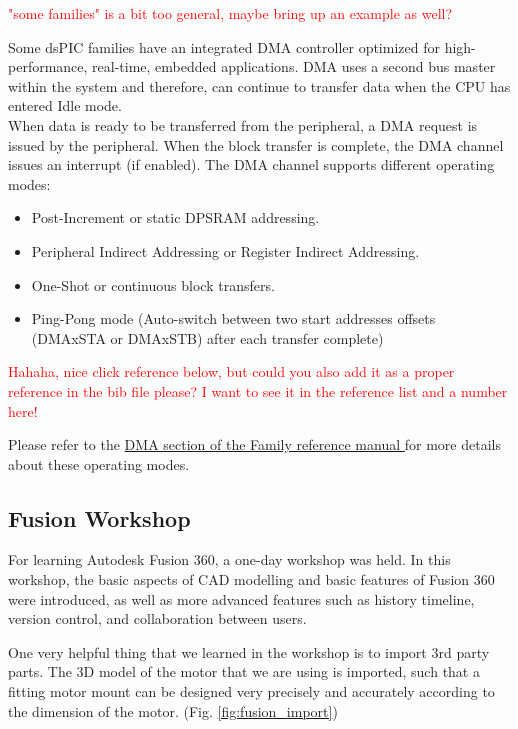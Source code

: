 \textcolor{red}{"some families" is a bit too general, maybe bring up an example as well?}

\vskip 0.2in
\noindent
Some dsPIC families have an integrated DMA controller optimized for high-performance, real-time, embedded applications. DMA uses a second bus master within the system and therefore, can continue to transfer data when the CPU has entered Idle mode.\\
When data is ready to be transferred from the peripheral, a DMA request is issued by the peripheral. When the block transfer is complete, the DMA channel issues an interrupt (if enabled).
\vskip 0.2in
\noindent
The DMA channel supports different operating modes:
\begin{itemize}
    \item Post-Increment or static DPSRAM addressing.
    \item Peripheral Indirect Addressing or Register Indirect Addressing.
    \item One-Shot or continuous block transfers.
    \item Ping-Pong mode (Auto-switch between two start addresses offsets (DMAxSTA or DMAxSTB) after each transfer complete)
\end{itemize}

\textcolor{red}{Hahaha, nice click reference below, but could you also add it as a proper reference in the bib file please? I want to see it in the reference list and a number here!}

Please refer to the \href{http://ww1.microchip.com/downloads/en/devicedoc/70215c.pdf}{DMA section of the Family reference manual }for more details about these operating modes.


\subsection{Fusion Workshop}
For learning Autodesk Fusion 360, a one-day workshop was held. In this workshop, the basic aspects of CAD modelling and basic features of Fusion 360 were introduced, as well as more advanced features such as history timeline, version control, and collaboration between users.

One very helpful thing that we learned in the workshop is to import 3rd party parts. The 3D model of the motor that we are using is imported, such that a fitting motor mount can be designed very precisely and accurately according to the dimension of the motor. (Fig. \ref{fig:fusion_import})

